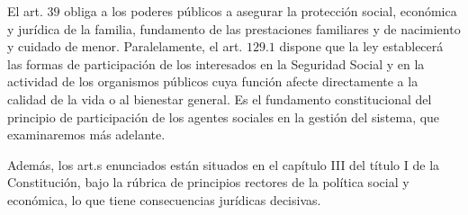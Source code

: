 \documentclass[10pt,a4paper]{article}
\begin{document}
El art. $39$ obliga a los poderes públicos a asegurar la protección social, económica y jurídica de la familia, fundamento de las prestaciones familiares y de nacimiento y cuidado de menor. Paralelamente, el art. $129.1$ dispone que la ley establecerá las formas de participación de los interesados en la Seguridad Social y en la actividad de los organismos públicos cuya función afecte directamente a la calidad de la vida o al bienestar general. Es el fundamento constitucional del principio de participación de los agentes sociales en la gestión del sistema, que examinaremos más adelante.

Además, los art.s enunciados están situados en el capítulo III del título I de la Constitución, bajo la rúbrica de principios rectores de la política social y económica, lo que tiene consecuencias jurídicas decisivas. 
\end{document}
